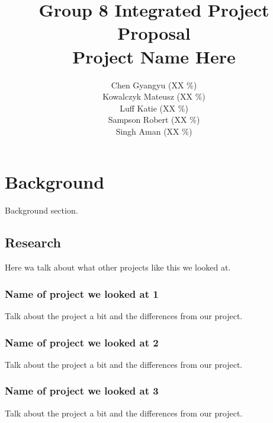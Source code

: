\documentclass[10pt,a4paper,oneside]{report}
\begin{document}
\title{Group 8 Integrated Project Proposal\\Project Name Here}

\author{
  Chen Gyangyu (XX \%)\\
  Kowalczyk Mateusz (XX \%)\\
  Luff Katie (XX \%)\\
  Sampson Robert (XX \%)\\
  Singh Aman (XX \%)\\ }
\maketitle
\section*{Background}
Background section.

\clearpage
\subsection*{Research}
Here wa talk about what other projects like this we looked at.


\subsubsection*{Name of project we looked at 1}
Talk about the project a bit and the differences from our project.


\subsubsection*{Name of project we looked at 2}
Talk about the project a bit and the differences from our project.

\subsubsection*{Name of project we looked at 3}
Talk about the project a bit and the differences from our project.



\end{document}

